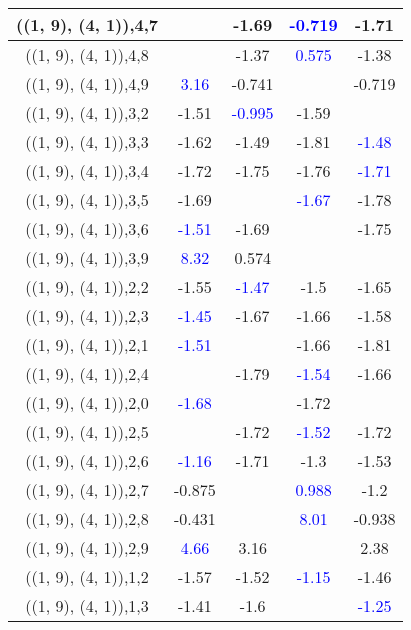 \documentclass{article}
\begin{document}
\begin{center}
\begin{longtable}{|c|c|c|c|c|}
        	\hline
        	((1, 9), (4, 1)),4,7&&-1.69& \textcolor{blue}{-0.719}&-1.71\\
        	\hline
        	((1, 9), (4, 1)),4,8&&-1.37& \textcolor{blue}{0.575}&-1.38\\
        	\hline
        	((1, 9), (4, 1)),4,9& \textcolor{blue}{3.16}&-0.741&&-0.719\\
        	\hline
        	((1, 9), (4, 1)),3,2&-1.51& \textcolor{blue}{-0.995}&-1.59&\\
        	\hline
        	((1, 9), (4, 1)),3,3&-1.62&-1.49&-1.81& \textcolor{blue}{-1.48}\\
        	\hline
        	((1, 9), (4, 1)),3,4&-1.72&-1.75&-1.76& \textcolor{blue}{-1.71}\\
        	\hline
        	((1, 9), (4, 1)),3,5&-1.69&& \textcolor{blue}{-1.67}&-1.78\\
        	\hline
        	((1, 9), (4, 1)),3,6& \textcolor{blue}{-1.51}&-1.69&&-1.75\\
        	\hline
        	((1, 9), (4, 1)),3,9& \textcolor{blue}{8.32}&0.574&&\\
        	\hline
        	((1, 9), (4, 1)),2,2&-1.55& \textcolor{blue}{-1.47}&-1.5&-1.65\\
        	\hline
        	((1, 9), (4, 1)),2,3& \textcolor{blue}{-1.45}&-1.67&-1.66&-1.58\\
        	\hline
        	((1, 9), (4, 1)),2,1& \textcolor{blue}{-1.51}&&-1.66&-1.81\\
        	\hline
        	((1, 9), (4, 1)),2,4&&-1.79& \textcolor{blue}{-1.54}&-1.66\\
        	\hline
        	((1, 9), (4, 1)),2,0& \textcolor{blue}{-1.68}&&-1.72&\\
        	\hline
        	((1, 9), (4, 1)),2,5&&-1.72& \textcolor{blue}{-1.52}&-1.72\\
        	\hline
        	((1, 9), (4, 1)),2,6& \textcolor{blue}{-1.16}&-1.71&-1.3&-1.53\\
        	\hline
        	((1, 9), (4, 1)),2,7&-0.875&& \textcolor{blue}{0.988}&-1.2\\
        	\hline
        	((1, 9), (4, 1)),2,8&-0.431&& \textcolor{blue}{8.01}&-0.938\\
        	\hline
        	((1, 9), (4, 1)),2,9& \textcolor{blue}{4.66}&3.16&&2.38\\
        	\hline
        	((1, 9), (4, 1)),1,2&-1.57&-1.52& \textcolor{blue}{-1.15}&-1.46\\
        	\hline
        	((1, 9), (4, 1)),1,3&-1.41&-1.6&& \textcolor{blue}{-1.25}\\

\end{longtable}
\end{center}
\end{document}
